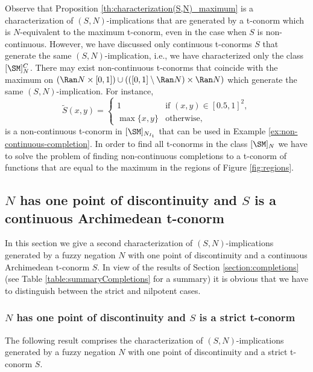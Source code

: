\begin{remark}
	Observe that Proposition \ref{th:characterization(S,N)_maximum} is a characterization of $(S,N)$-implications that are generated by a t-conorm which is $N$-equivalent to the maximum t-conorm, even in the case when $S$ is non-continuous. However, we have discussed only continuous t-conorms $S$ that generate the same $(S,N)$-implication, i.e., we have characterized only the class $[\SM]_N^C$. There may exist non-continuous t-conorms that coincide with the maximum on $(\Ran N \times [0,1]) \cup (([0,1] \setminus \Ran N) \times \Ran N)$ which generate the same $(S,N)$-implication. For instance,
	$$\tilde{S}(x,y)
	=
	\left\{ \begin{array}{ll}
		1 &   \text{if }   (x,y) \in [0.5,1]^2, \\
		\max\{x,y\} & \text{otherwise,}
	\end{array} \right.
	$$
	is a non-continuous t-conorm in $[\SM]_{N_{I_1}}$ that can be used in Example \ref{ex:non-continuous-completion}. In order to find all t-conorms in the class $[\SM]_N$ we have to solve the problem of finding non-continuous completions to a t-conorm of functions that are equal to the maximum in the regions of Figure \ref{fig:regions}.
\end{remark}

\subsection{$N$ has one point of discontinuity and $S$ is a continuous \newline Archimedean t-conorm}

In this section we give a second characterization of $(S,N)$-implications generated by a fuzzy negation $N$ with one point of discontinuity and a continuous Archimedean t-conorm $S$. In view of the results of Section \ref{section:completions} (see Table \ref{table:summaryCompletions} for a summary) it is obvious that we have to distinguish between the strict and nilpotent cases.

\subsubsection{$N$ has one point of discontinuity and $S$ is a strict t-conorm}

The following result comprises the characterization of $(S,N)$-implications generated by a fuzzy negation $N$ with one point of discontinuity and a strict t-conorm $S$.

